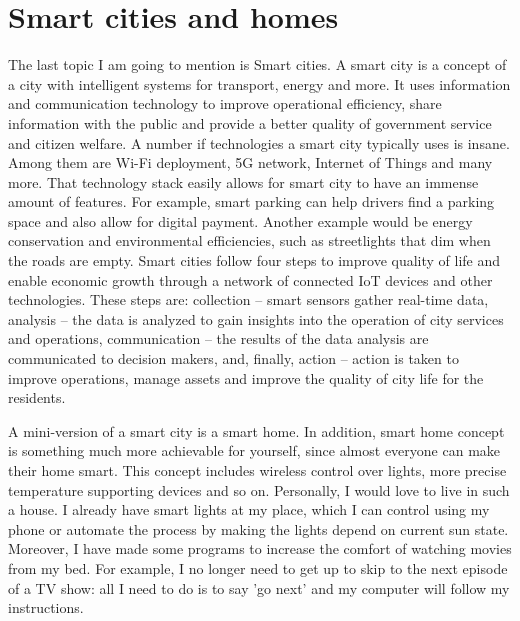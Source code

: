 \documentclass[a4paper,12pt]{article}
\begin{document}
    \section{Smart cities and homes}
    The last topic I am going to mention is Smart cities. A smart city is a concept of a city with intelligent systems for transport, energy and more.
    It uses information and communication technology to improve operational efficiency, share information with the public and provide a better quality of
    government service and citizen welfare. A number if technologies a smart city typically uses is insane. Among them are Wi-Fi deployment, 5G network,
    Internet of Things and many more. That technology stack easily allows for smart city to have an immense amount of features. For example, smart parking
    can help drivers find a parking space and also allow for digital payment. Another example would be energy conservation and environmental efficiencies,
    such as streetlights that dim when the roads are empty. Smart cities follow four steps to improve quality of life and enable economic growth through a
    network of connected IoT devices and other technologies. These steps are: collection -- smart sensors gather real-time data, analysis -- the data is analyzed
    to gain insights into the operation of city services and operations, communication -- the results of the data analysis are communicated to decision makers, and,
    finally, action -- action is taken to improve operations, manage assets and improve the quality of city life for the residents.

    A mini-version of a smart city is a smart home. In addition, smart home concept is something much more achievable for yourself, since almost everyone can make
    their home smart. This concept includes wireless control over lights, more precise temperature supporting devices and so on. Personally, I would love to live
    in such a house. I already have smart lights at my place, which I can control using my phone or automate the process by making the lights depend on current sun
    state. Moreover, I have made some programs to increase the comfort of watching movies from my bed. For example, I no longer need to get up to skip to the next
    episode of a TV show: all I need to do is to say 'go next' and my computer will follow my instructions.
\end{document}
